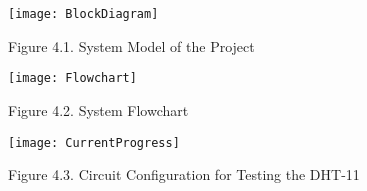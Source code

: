 \texttt{[image: BlockDiagram]}

\begin{center}
Figure 4.1. System Model of the Project
\end{center}

\begin{center}
\texttt{[image: Flowchart]}
\end{center}




\begin{center}
Figure 4.2. System Flowchart
\end{center}

\texttt{[image: CurrentProgress]}

\begin{center}
Figure 4.3. Circuit Configuration for Testing the DHT-11
\end{center}








